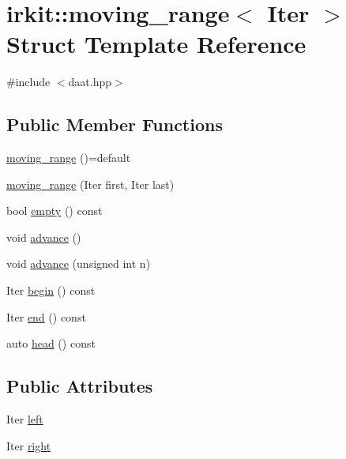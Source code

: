\hypertarget{structirkit_1_1moving__range}{}\section{irkit\+:\+:moving\+\_\+range$<$ Iter $>$ Struct Template Reference}
\label{structirkit_1_1moving__range}


{\ttfamily \#include $<$daat.\+hpp$>$}

\subsection*{Public Member Functions}
\begin{DoxyCompactItemize}
\item 
\hyperlink{structirkit_1_1moving__range_a9b6d474c670875034ca5a044b0a2fc14}{moving\+\_\+range} ()=default
\item 
\hyperlink{structirkit_1_1moving__range_a79a261cc6e7da7ffb0d93a198fe3dab7}{moving\+\_\+range} (Iter first, Iter last)
\item 
bool \hyperlink{structirkit_1_1moving__range_a8d4e48c5d31fbc158da77eec0c90010e}{empty} () const
\item 
void \hyperlink{structirkit_1_1moving__range_a5ee65e31d2983395c02b724ede47c034}{advance} ()
\item 
void \hyperlink{structirkit_1_1moving__range_a792efd70f3efcb651bff438a0e0814ce}{advance} (unsigned int n)
\item 
Iter \hyperlink{structirkit_1_1moving__range_af58c3dbe1e87c3222ee4a80aa745d9a1}{begin} () const
\item 
Iter \hyperlink{structirkit_1_1moving__range_a5e5ff06f38d6cdba4735e7dd632759ef}{end} () const
\item 
auto \hyperlink{structirkit_1_1moving__range_a4e4c1a83cb13e1ca572275b2c7885aeb}{head} () const
\end{DoxyCompactItemize}
\subsection*{Public Attributes}
\begin{DoxyCompactItemize}
\item 
Iter \hyperlink{structirkit_1_1moving__range_a175a0bc6996715ea27e6b87abff03139}{left}
\item 
Iter \hyperlink{structirkit_1_1moving__range_aa64b16b98bdd7b627ecceb82c8ef3bec}{right}
\end{DoxyCompactItemize}


